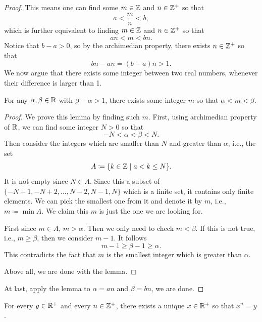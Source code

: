 \begin{proof}
This means one can find some $m\in\mathbb Z$ and $n\in\mathbb Z^+$ so that
\[a<\frac{m}{n}<b,\]
which is further equivalent to finding $m\in\mathbb Z$ and $n\in\mathbb Z^+$ so that
\[an<m<bn.\]
Notice that $b-a>0$, so by the archimedian property, there exists $n\in\mathbb Z^+$ so that
\[bn-an=(b-a)n>1.\]
We now argue that there exists some integer between two real numbers, whenever their difference is larger than 1.

\begin{lemma*}
For any $\alpha,\beta\in\mathbb R$ with $\beta-\alpha>1$, there exists some integer $m$ so that $\alpha<m<\beta$.
\end{lemma*}

\begin{proof}
We prove this lemma by finding such $m$. First, using archimedian property of $\mathbb R$, we can find some integer $N>0$ so that
\[-N<\alpha<\beta<N.\]
Then consider the integers which are smaller than $N$ and greater than $\alpha$, i.e., the set
\[A\coloneqq\{k\in\mathbb Z\mid a<k\le N\}.\]
It is not empty since $N\in A$. Since this a subset of $\{-N+1,-N+2,\dots,N-2,N-1,N\}$ which is a finite set, it contains only finite elements. We can pick the smallest one from it and denote it by $m$, i.e., $m\coloneqq\min A$. We claim this $m$ is just the one we are looking for.

First since $m\in A$, $m>\alpha$. Then we only need to check $m<\beta$. If this is not true, i.e., $m\ge\beta$, then we consider $m-1$. It follows
\[m-1\ge\beta-1\ge\alpha.\]
This contradicts the fact that $m$ is the smallest integer which is greater than $\alpha$.

Above all, we are done with the lemma.
\end{proof}

At last, apply the lemma to $\alpha=an$ and $\beta=bn$, we are done.
\end{proof}

\begin{theorem}
For every $y\in\mathbb R^+$ and every $n\in\mathbb Z^+$, there exists a unique $x\in\mathbb R^+$ so that $x^n=y$.
\end{theorem}

